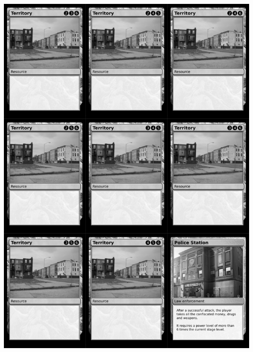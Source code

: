 \documentclass[a4paper]{article}
\begin{document}
\newpage

\begin{center}
	\centering
	\includegraphics[width=200.5mm,height=280.7mm]{output/temp/page27.png}
\end{center}
\end{document}
